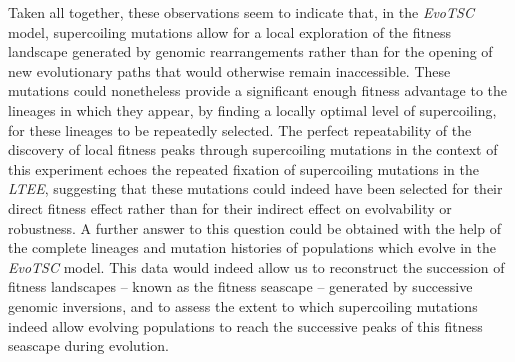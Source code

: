 Taken all together, these observations seem to indicate that, in the \emph{EvoTSC} model, supercoiling mutations allow for a local exploration of the fitness landscape generated by genomic rearrangements rather than for the opening of new evolutionary paths that would otherwise remain inaccessible.
These mutations could nonetheless provide a significant enough fitness advantage to the lineages in which they appear, by finding a locally optimal level of supercoiling, for these lineages to be repeatedly selected.
The perfect repeatability of the discovery of local fitness peaks through supercoiling mutations in the context of this experiment echoes the repeated fixation of supercoiling mutations in the \emph{LTEE}, suggesting that these mutations could indeed have been selected for their direct fitness effect rather than for their indirect effect on evolvability or robustness.
A further answer to this question could be obtained with the help of the complete lineages and mutation histories of populations which evolve in the \emph{EvoTSC} model.
This data would indeed allow us to reconstruct the succession of fitness landscapes -- known as the fitness seascape -- generated by successive genomic inversions, and to assess the extent to which supercoiling mutations indeed allow evolving populations to reach the successive peaks of this fitness seascape during evolution.
